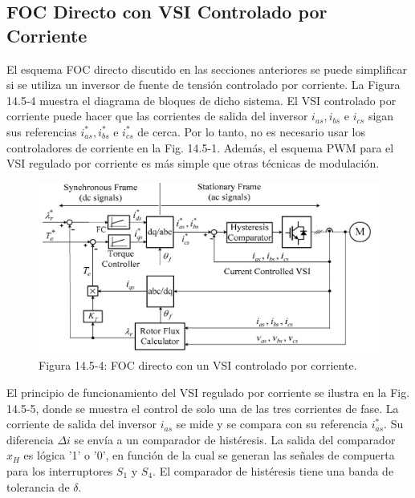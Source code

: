 \documentclass[letterpaper,12pt]{article} %
\begin{document}
\subsection{FOC Directo con VSI Controlado por Corriente}

El esquema FOC directo discutido en las secciones anteriores se puede simplificar si se utiliza un inversor de fuente de tensión controlado por corriente. La Figura 14.5-4 muestra el diagrama de bloques de dicho sistema. El VSI controlado por corriente puede hacer que las corrientes de salida del inversor \( i_{as}, i_{bs} \) e \( i_{cs} \) sigan sus referencias \( i_{as}^*, i_{bs}^* \) e \( i_{cs}^* \) de cerca. Por lo tanto, no es necesario usar los controladores de corriente en la Fig. 14.5-1. Además, el esquema PWM para el VSI regulado por corriente es más simple que otras técnicas de modulación.


\begin{figure}[ht]
    \centering
    \includegraphics{graficos/img16.jpg} 
    \caption{Figura 14.5-4: FOC directo con un VSI controlado por corriente.}
    \label{fig:14.5-4}
\end{figure}
\FloatBarrier


El principio de funcionamiento del VSI regulado por corriente se ilustra en la Fig. 14.5-5, donde se muestra el control de solo una de las tres corrientes de fase. La corriente de salida del inversor \( i_{as} \) se mide y se compara con su referencia \( i_{as}^* \). Su diferencia \( \Delta i \) se envía a un comparador de histéresis. La salida del comparador \( x_H \) es lógica '1' o '0', en función de la cual se generan las señales de compuerta para los interruptores \( S_1 \) y \( S_4 \). El comparador de histéresis tiene una banda de tolerancia de \( \delta \).
\end{document}
